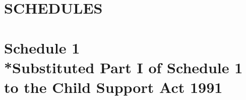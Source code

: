 \documentclass[12pt,a4paper]{article}
\begin{document}
\part*{SCHEDULES}

\part[Schedule 1 --- Substituted Part I of Schedule 1 to the Child Support Act 1991]{Schedule 1\\*Substituted Part I of Schedule 1 to the Child Support Act 1991}

\renewcommand\parthead{--- Schedule 1}

\end{document}
